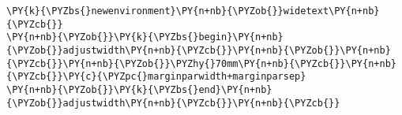 \begin{Verbatim}[commandchars=\\\{\}]
\PY{k}{\PYZbs{}newenvironment}\PY{n+nb}{\PYZob{}}widetext\PY{n+nb}{\PYZcb{}}
\PY{n+nb}{\PYZob{}}\PY{k}{\PYZbs{}begin}\PY{n+nb}{\PYZob{}}adjustwidth\PY{n+nb}{\PYZcb{}}\PY{n+nb}{\PYZob{}}\PY{n+nb}{\PYZcb{}}\PY{n+nb}{\PYZob{}}\PYZhy{}70mm\PY{n+nb}{\PYZcb{}}\PY{n+nb}{\PYZcb{}}\PY{c}{\PYZpc{}marginparwidth+marginparsep}
\PY{n+nb}{\PYZob{}}\PY{k}{\PYZbs{}end}\PY{n+nb}{\PYZob{}}adjustwidth\PY{n+nb}{\PYZcb{}}\PY{n+nb}{\PYZcb{}}
\end{Verbatim}
